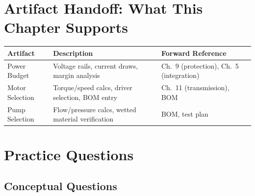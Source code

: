 \documentclass[11pt,letterpaper,twoside,openany]{book}
\begin{document}
\section{Artifact Handoff: What This Chapter Supports}
\begin{table}[htbp]\centering\small
\begin{tabularx}{\textwidth}{l X l}
\toprule
\textbf{Artifact} & \textbf{Description} & \textbf{Forward Reference} \\
\midrule
Power Budget & Voltage rails, current draws, margin analysis & Ch.~9 (protection), Ch.~5 (integration) \\
Motor Selection & Torque/speed calcs, driver selection, BOM entry & Ch.~11 (transmission), BOM \\
Pump Selection & Flow/pressure calcs, wetted material verification & BOM, test plan \\
\bottomrule
\end{tabularx}
\end{table}

\section{Practice Questions}

\subsection{Conceptual Questions}
\end{document}
